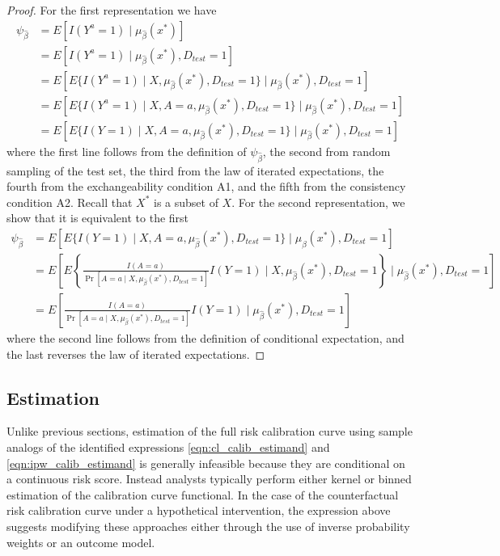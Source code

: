 \begin{proof}
    For the first representation we have 
    \begin{align*}
        \psi_{\widehat{\beta}} &= E[I(Y^a = 1) \mid \mu_{\widehat{\beta}}(x^*)] \\
        & = E[I(Y^a = 1) \mid \mu_{\widehat{\beta}}(x^*), D_{test} = 1] \\
        & = E[E\{I(Y^a = 1) \mid X, \mu_{\widehat{\beta}}(x^*), D_{test} = 1\}\mid \mu_{\widehat{\beta}}(x^*), D_{test} = 1] \\
        & = E[E\{I(Y^a = 1) \mid X, A = a, \mu_{\widehat{\beta}}(x^*), D_{test} = 1\}\mid \mu_{\widehat{\beta}}(x^*), D_{test} = 1] \\
        & = E[E\{I(Y = 1) \mid X, A = a, \mu_{\widehat{\beta}}(x^*), D_{test} = 1\}\mid \mu_{\widehat{\beta}}(x^*), D_{test} = 1]
    \end{align*}
    where the first line follows from the definition of $\psi_{\widehat{\beta}}$, the second from random sampling of the test set, the third from the law of iterated expectations, the fourth from the exchangeability condition A1, and the fifth from the consistency condition A2. Recall that $X^*$ is a subset of $X$. For the second representation, we show that it is equivalent to the first 
    \begin{align*}
        \psi_{\widehat{\beta}} &= E[E\{I(Y = 1) \mid X, A = a, \mu_{\widehat{\beta}}(x^*), D_{test} = 1\}\mid \mu_{\widehat{\beta}}(x^*), D_{test} = 1] \\
        &= E\left[E\left\{\frac{I(A = a)}{\Pr[A = a \mid X, \mu_{\widehat{\beta}}(x^*), D_{test} = 1]} I(Y=1) \mid X, \mu_{\widehat{\beta}}(x^*), D_{test} = 1\right\}\mid \mu_{\widehat{\beta}}(x^*), D_{test} = 1\right] \\
        &= E\left[\frac{I(A = a)}{\Pr[A = a \mid X, \mu_{\widehat{\beta}}(x^*), D_{test} = 1]} I(Y=1) \mid \mu_{\widehat{\beta}}(x^*), D_{test} = 1\right]
    \end{align*}
    where the second line follows from the definition of conditional expectation, and the last reverses the law of iterated expectations.
\end{proof}

\subsection{Estimation}
Unlike previous sections, estimation of the full risk calibration curve using sample analogs of the identified expressions \ref{eqn:cl_calib_estimand} and \ref{eqn:ipw_calib_estimand} is generally infeasible because they are conditional on a continuous risk score. Instead analysts typically perform either kernel or binned estimation of the calibration curve functional. In the case of the counterfactual risk calibration curve under a hypothetical intervention, the expression above suggests modifying these approaches either through the use of inverse probability weights or an outcome model. 


